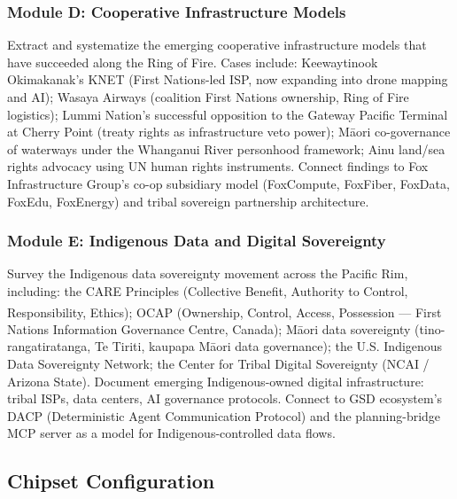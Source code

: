 \documentclass[11pt,letterpaper]{article}
\begin{document}
\subsubsection{Module D: Cooperative Infrastructure Models}

Extract and systematize the emerging cooperative infrastructure models that have succeeded along the Ring of Fire. Cases include: Keewaytinook Okimakanak's KNET (First Nations-led ISP, now expanding into drone mapping and AI); Wasaya Airways (coalition First Nations ownership, Ring of Fire logistics); Lummi Nation's successful opposition to the Gateway Pacific Terminal at Cherry Point (treaty rights as infrastructure veto power); Māori co-governance of waterways under the Whanganui River personhood framework; Ainu land/sea rights advocacy using UN human rights instruments. Connect findings to Fox Infrastructure Group's co-op subsidiary model (FoxCompute, FoxFiber, FoxData, FoxEdu, FoxEnergy) and tribal sovereign partnership architecture.

\subsubsection{Module E: Indigenous Data and Digital Sovereignty}

Survey the Indigenous data sovereignty movement across the Pacific Rim, including: the CARE Principles (Collective Benefit, Authority to Control, Responsibility, Ethics); OCAP\textsuperscript{\textregistered} (Ownership, Control, Access, Possession --- First Nations Information Governance Centre, Canada); Māori data sovereignty (tino-rangatiratanga, Te Tiriti, kaupapa Māori data governance); the U.S. Indigenous Data Sovereignty Network; the Center for Tribal Digital Sovereignty (NCAI / Arizona State). Document emerging Indigenous-owned digital infrastructure: tribal ISPs, data centers, AI governance protocols. Connect to GSD ecosystem's DACP (Deterministic Agent Communication Protocol) and the planning-bridge MCP server as a model for Indigenous-controlled data flows.

\subsection{Chipset Configuration}
\end{document}
